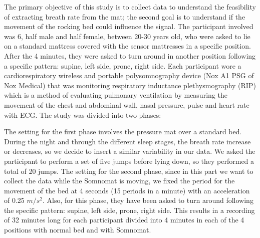 The primary objective of this study is to collect data to understand the feasibility of extracting breath rate from the mat; the second goal is to understand if the movement of the rocking bed could influence the signal.
The participant involved was 6, half male and half female, between 20-30 years old, who were asked to lie on a standard mattress covered with the sensor mattresses in a specific position. 
After the 4 minutes, they were asked to turn around in another position following a specific pattern: supine, left side, prone, right side.
Each participant wore a cardiorespiratory wireless and portable polysomnography device (Nox A1 PSG of Nox Medical) that was
monitoring respiratory inductance plethysmography (RIP) which is a method of evaluating pulmonary ventilation by measuring the movement of the chest and abdominal wall, nasal pressure, pulse and heart rate with ECG. 
The study was divided into two phases:

The setting for the first phase involves the pressure mat over a standard bed. During the night and through the different sleep stages, the breath rate increase or decreases, so we decide to insert a similar variability in our data. We asked the participant to perform a set of five jumps before lying down, so they performed a total of 20 jumps.
The setting for the second phase, since in this part we want to collect the data while the Somnomat is moving, we fixed the period for the movement of the bed at 4 seconds (15 periods in a minute) with an acceleration of 0.25 $m/s^2$. Also, for this phase, they have been asked to turn around following the specific pattern: supine, left side, prone, right side.
This results in a recording of 32 minutes long for each participant divided into 4 minutes in each of the 4 positions with normal bed and with Somnomat.

